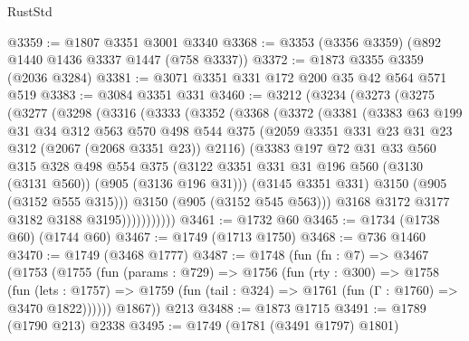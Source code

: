 \begin{lexlean}{RustStd}
\begin{coremodule}
@3359 := @1807 @3351 @3001 @3340
@3368 := @3353 (@3356 @3359) (@892 @1440 @1436 @3337 @1447 (@758 @3337))
@3372 := @1873 @3355 @3359 (@2036 @3284)
@3381 := @3071 @3351 @331 @172 @200 @35 @42 @564 @571 @519
@3383 := @3084 @3351 @331
@3460 := @3212
    (@3234
      (@3273
        (@3275
          (@3277
            (@3298
              (@3316
                (@3333
                  (@3352
                    (@3368
                      (@3372
                        (@3381
                          (@3383
                            @63
                            @199
                            @31
                            @34
                            @312
                            @563
                            @570
                            @498
                            @544
                            @375
                            (@2059 @3351 @331 @23 @31 @23 @312 (@2067 (@2068 @3351 @23)) @2116)
                            (@3383
                              @197
                              @72
                              @31
                              @33
                              @560
                              @315
                              @328
                              @498
                              @554
                              @375
                              (@3122
                                @3351
                                @331
                                @31
                                @196
                                @560
                                (@3130 (@3131 @560))
                                (@905 (@3136 @196 @31)))
                              (@3145 @3351 @331)
                              @3150
                              (@905 (@3152 @555 @315)))
                            @3150
                            (@905 (@3152 @545 @563)))
                          @3168
                          @3172
                          @3177
                          @3182
                          @3188
                          @3195)))))))))))
@3461 := @1732 @60
@3465 := @1734 (@1738 @60) (@1744 @60)
@3467 := @1749 (@1713 @1750)
@3468 := @736 @1460
@3470 := @1749 (@3468 @1777)
@3487 := @1748
    (fun (fn : @7) =>
    @3467
      (@1753
        (@1755
          (fun (params : @729) =>
          @1756
            (fun (rty : @300) =>
            @1758
              (fun (lets : @1757) =>
              @1759 (fun (tail : @324) => @1761 (fun (Γ : @1760) => @3470 @1822))))))
        @1867))
    @213
@3488 := @1873 @1715
@3491 := @1789 (@1790 @213) @2338
@3495 := @1749 (@1781 (@3491 @1797) @1801)

\end{coremodule}
\end{lexlean}
